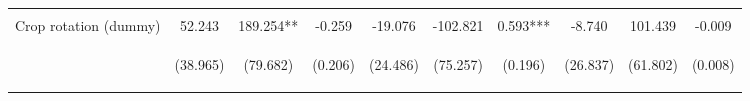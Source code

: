 \begin{center}
\begin{tabular}{lccccccccc}
\vspace{4pt} & \begin{footnotesize}[0.906]\end{footnotesize} & \begin{footnotesize}[0.474]\end{footnotesize} & \begin{footnotesize}[0.575]\end{footnotesize} & \begin{footnotesize}[0.002]\end{footnotesize} & \begin{footnotesize}[0.452]\end{footnotesize} & \begin{footnotesize}[0.084]\end{footnotesize} & \begin{footnotesize}[0.843]\end{footnotesize} & \begin{footnotesize}[0.501]\end{footnotesize} & \begin{footnotesize}[0.040]\end{footnotesize} \\
Crop rotation (dummy) & 52.243 & 189.254** & -0.259 & -19.076 & -102.821 & 0.593*** & -8.740 & 101.439 & -0.009 \\
 & \begin{footnotesize}(38.965)\end{footnotesize} & \begin{footnotesize}(79.682)\end{footnotesize} & \begin{footnotesize}(0.206)\end{footnotesize} & \begin{footnotesize}(24.486)\end{footnotesize} & \begin{footnotesize}(75.257)\end{footnotesize} & \begin{footnotesize}(0.196)\end{footnotesize} & \begin{footnotesize}(26.837)\end{footnotesize} & \begin{footnotesize}(61.802)\end{footnotesize} & \begin{footnotesize}(0.008)\end{footnotesize} \\

\end{tabular}
\end{center}
